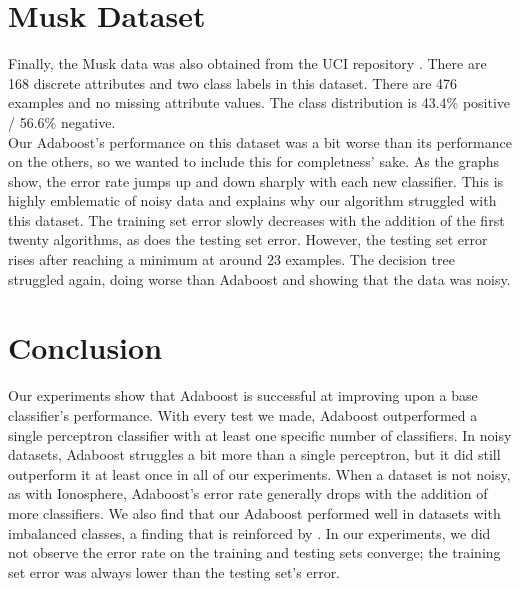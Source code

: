 \documentclass{article}
\begin{document}
\section{Musk Dataset}

Finally, the Musk data was also obtained from the UCI repository \cite{musk}. There are 168 discrete attributes and two class labels in this dataset. There are 476 examples and no missing attribute values. The class distribution is 43.4\% positive / 56.6\% negative. \\

Our Adaboost's performance on this dataset was a bit worse than its performance on the others, so we wanted to include this for completness' sake. As the graphs show, the error rate jumps up and down sharply with each new classifier. This is highly emblematic of noisy data and explains why our algorithm struggled with this dataset. The training set error slowly  decreases with the addition of the first twenty algorithms, as does the testing set error. However, the testing set error rises after reaching a minimum at around 23 examples. The decision tree struggled again, doing worse than Adaboost and showing that the data was noisy.

\section{Conclusion}

Our experiments show that Adaboost is successful at improving upon a base classifier's performance. With every test we made, Adaboost outperformed a single perceptron classifier with at least one specific number of classifiers. In noisy datasets, Adaboost struggles a bit more than a single perceptron, but it did still outperform it at least once in all of our experiments. When a dataset is not noisy, as with Ionosphere, Adaboost's error rate generally drops with the addition of more classifiers. We also find that our Adaboost performed well in datasets with imbalanced classes, a finding that is reinforced by \cite{sun-kamel-wang}. In our experiments, we did not observe the error rate on the training and testing sets converge; the training set error was always lower than the testing set's error. \\


 
\end{document}
